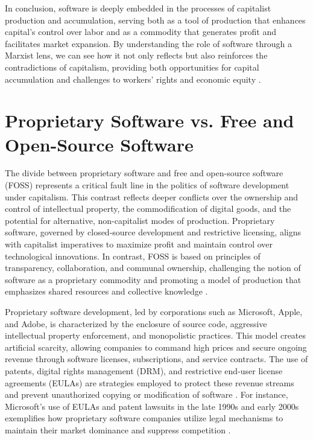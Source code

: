\begin{refsection}
In conclusion, software is deeply embedded in the processes of capitalist production and accumulation, serving both as a tool of production that enhances capital’s control over labor and as a commodity that generates profit and facilitates market expansion. By understanding the role of software through a Marxist lens, we can see how it not only reflects but also reinforces the contradictions of capitalism, providing both opportunities for capital accumulation and challenges to workers' rights and economic equity \cite[pp.~1-25]{marx2008}.

\section{Proprietary Software vs. Free and Open-Source Software}

The divide between proprietary software and free and open-source software (FOSS) represents a critical fault line in the politics of software development under capitalism. This contrast reflects deeper conflicts over the ownership and control of intellectual property, the commodification of digital goods, and the potential for alternative, non-capitalist modes of production. Proprietary software, governed by closed-source development and restrictive licensing, aligns with capitalist imperatives to maximize profit and maintain control over technological innovations. In contrast, FOSS is based on principles of transparency, collaboration, and communal ownership, challenging the notion of software as a proprietary commodity and promoting a model of production that emphasizes shared resources and collective knowledge \cite[pp.~85-90]{stallman2010}.

Proprietary software development, led by corporations such as Microsoft, Apple, and Adobe, is characterized by the enclosure of source code, aggressive intellectual property enforcement, and monopolistic practices. This model creates artificial scarcity, allowing companies to command high prices and secure ongoing revenue through software licenses, subscriptions, and service contracts. The use of patents, digital rights management (DRM), and restrictive end-user license agreements (EULAs) are strategies employed to protect these revenue streams and prevent unauthorized copying or modification of software \cite[pp.~45-50]{perens2005}. For instance, Microsoft's use of EULAs and patent lawsuits in the late 1990s and early 2000s exemplifies how proprietary software companies utilize legal mechanisms to maintain their market dominance and suppress competition \cite[pp.~110-115]{schiller2000}.


\end{refsection}
